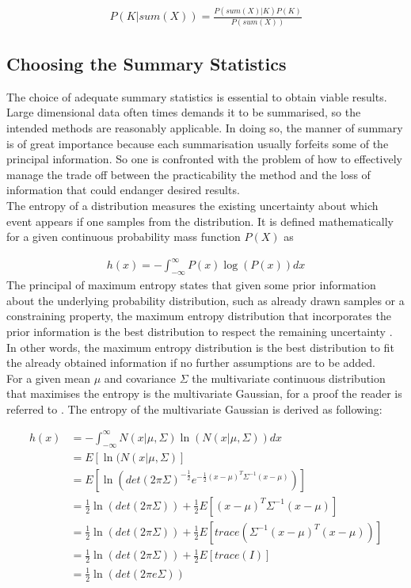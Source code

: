 \documentclass[a4paper, 11pt]{article}
\begin{document}
\begin{align*}
P(K | sum(X)) = \frac{P(sum(X) | K) P(K)}{P(sum(X))}
\end{align*}

\subsection{Choosing the Summary Statistics}

The choice of adequate summary statistics is essential to obtain viable results. Large dimensional data often times demands it to be summarised, so the intended methods are reasonably applicable. In doing so, the manner of summary is of great importance because each summarisation usually forfeits some of the principal information. So one is confronted with the problem of how to effectively manage the trade off between the practicability the method and the loss of information that could endanger desired results.\\
The entropy of a distribution measures the existing uncertainty about which event appears if one samples from the distribution. It is defined mathematically for a given continuous probability mass function $P(X)$ as

\begin{align*}
h(x) = - \int_{-\infty}^{\infty}P(x)\log(P(x))dx
\end{align*}
The principal of maximum entropy states that given some prior information about the underlying probability distribution, such as already drawn samples or a constraining property, the maximum entropy distribution that incorporates the prior information is the best distribution to respect the remaining uncertainty \parencite{jaynes1957information}. In other words, the maximum entropy distribution is the best distribution to fit the already obtained information if no further assumptions are to be added. \\
For a given mean $\mu$ and covariance $\Sigma$ the multivariate continuous distribution that maximises the entropy is the multivariate Gaussian, for a proof the reader is referred to \cite{cover2012elements}.
The entropy of the multivariate Gaussian is derived as following:

\begin{align*}
h(x) & = - \int_{-\infty}^{\infty} N(x|\mu, \Sigma)\ln(N(x|\mu, \Sigma))dx \\
& = E[\ln(N(x|\mu, \Sigma)] \\
& = E[\ln(det(2\pi\Sigma)^{-\frac{1}{2}}e^{-\frac{1}{2}(x-\mu)^T\Sigma^{-1}(x-\mu)})] \\
& = \frac{1}{2}\ln(det(2\pi\Sigma)) + \frac{1}{2} E[(x-\mu)^T \Sigma^{-1}(x-\mu)]\\
& = \frac{1}{2} \ln(det(2\pi\Sigma)) + \frac{1}{2} E[trace(\Sigma^{-1}(x-\mu)^T (x-\mu))]\\
& = \frac{1}{2} \ln(det(2\pi\Sigma)) + \frac{1}{2} E[trace(I)]\\
& = \frac{1}{2} \ln(det(2\pi e \Sigma))
\end{align*}
\end{document}
